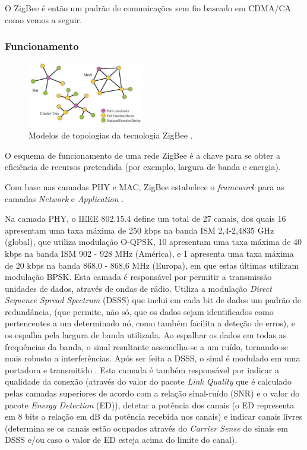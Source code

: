 \documentclass[conference]{IEEEtran}
\begin{document}
O ZigBee é então um padrão de comunicações sem fio baseado em CDMA/CA como vemos a seguir. 


\subsubsection{Funcionamento}

\begin{figure}[!t]
  \centering
  \includegraphics[width=0.45\textwidth]{Modelos_Topologias_ZigBee.png}
  \caption{Modelos de topologias da tecnologia ZigBee \cite{sinem2004zigbee}.}
  \label{fig:topZigBee}
\end{figure}

O esquema de funcionamento de uma rede ZigBee é a chave para se obter a eficiência de recursos pretendida (por exemplo, largura de banda e energia).

Com base nas camadas PHY e MAC, ZigBee estabelece o \textit{framework} para as camadas \textit{Network} e \textit{Application} \cite{liang2006impact}.

Na camada PHY, o IEEE 802.15.4 define um total de 27 canais, dos quais 16 apresentam uma taxa máxima de 250 kbps na banda ISM 2,4-2,4835 GHz (global), que utiliza modulação O-QPSK, 10 apresentam uma taxa máxima de 40 kbps na banda ISM 902 - 928 MHz (América), e 1 apresenta uma taxa máxima de 20 kbps na banda 868,0 - 868,6 MHz (Europa), em que estas últimas utilizam modulação BPSK.
Esta camada é responsável por permitir a transmissão unidades de dados, através de ondas de rádio.
Utiliza a modulação \textit{Direct Sequence Spread Spectrum} (DSSS) que inclui em cada bit de dados um padrão de redundância, (que permite, não só, que os dados sejam identificados como pertencentes a um determinado nó, como também facilita a deteção de erros), e os espalha pela largura de banda utilizada.
Ao espalhar os dados em todas as frequências da banda, o sinal resultante assemelha-se a um ruído, tornando-se mais robusto a interferências. Após ser feita a DSSS, o sinal é modulado em uma portadora e transmitido \cite{liang2006impact}.
Esta camada é também responsável por indicar a qualidade da conexão (através do valor do pacote \textit{Link Quality} que é calculado pelas camadas superiores de acordo com a relação sinal-ruído (SNR) e o valor do pacote \textit{Energy Detection} (ED)), detetar a potência dos canais (o ED representa em 8 bits a relação em dB da potência recebida nos canais) e indicar canais livres (determina se os canais estão ocupados através do \textit{Carrier Sense} do sinais em DSSS e/ou caso o valor de ED esteja acima do limite do canal). 
\end{document}
